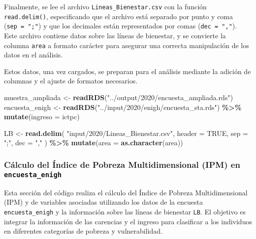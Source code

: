\documentclass[
  12pt,
]{book}
\newenvironment{Shaded}{\begin{snugshade}}{\end{snugshade}}
\newcommand{\AttributeTok}[1]{\textcolor[rgb]{0.13,0.29,0.53}{#1}}
\newcommand{\ConstantTok}[1]{\textcolor[rgb]{0.56,0.35,0.01}{#1}}
\newcommand{\FunctionTok}[1]{\textcolor[rgb]{0.13,0.29,0.53}{\textbf{#1}}}
\newcommand{\NormalTok}[1]{#1}
\newcommand{\OtherTok}[1]{\textcolor[rgb]{0.56,0.35,0.01}{#1}}
\newcommand{\SpecialCharTok}[1]{\textcolor[rgb]{0.81,0.36,0.00}{\textbf{#1}}}
\newcommand{\StringTok}[1]{\textcolor[rgb]{0.31,0.60,0.02}{#1}}
\begin{document}
Finalmente, se lee el archivo \texttt{Lineas\_Bienestar.csv} con la función \texttt{read.delim()}, especificando que el archivo está separado por punto y coma (\texttt{sep\ =\ ";"}) y que los decimales están representados por comas (\texttt{dec\ =\ ","}). Este archivo contiene datos sobre las líneas de bienestar, y se convierte la columna \texttt{area} a formato carácter para asegurar una correcta manipulación de los datos en el análisis.

Estos datos, una vez cargados, se preparan para el análisis mediante la adición de columnas y el ajuste de formatos necesarios.

\begin{Shaded}
\begin{Highlighting}[]
\NormalTok{muestra\_ampliada }\OtherTok{\textless{}{-}} \FunctionTok{readRDS}\NormalTok{(}\StringTok{"../output/2020/encuesta\_ampliada.rds"}\NormalTok{)}
\NormalTok{encuesta\_enigh }\OtherTok{\textless{}{-}} \FunctionTok{readRDS}\NormalTok{(}\StringTok{"../input/2020/enigh/encuesta\_sta.rds"}\NormalTok{) }\SpecialCharTok{\%\textgreater{}\%}
  \FunctionTok{mutate}\NormalTok{(}\AttributeTok{ingreso =}\NormalTok{ ictpc)}

\NormalTok{LB }\OtherTok{\textless{}{-}} \FunctionTok{read.delim}\NormalTok{(}
    \StringTok{"input/2020/Lineas\_Bienestar.csv"}\NormalTok{,}
    \AttributeTok{header =} \ConstantTok{TRUE}\NormalTok{,}
    \AttributeTok{sep =} \StringTok{";"}\NormalTok{,}
    \AttributeTok{dec =} \StringTok{","}
\NormalTok{  ) }\SpecialCharTok{\%\textgreater{}\%} \FunctionTok{mutate}\NormalTok{(}\AttributeTok{area =} \FunctionTok{as.character}\NormalTok{(area))}
\end{Highlighting}
\end{Shaded}

\hypertarget{cuxe1lculo-del-uxedndice-de-pobreza-multidimensional-ipm-en-encuesta_enigh}{%
\subsubsection*{\texorpdfstring{Cálculo del Índice de Pobreza Multidimensional (IPM) en \texttt{encuesta\_enigh}}{Cálculo del Índice de Pobreza Multidimensional (IPM) en encuesta\_enigh}}\label{cuxe1lculo-del-uxedndice-de-pobreza-multidimensional-ipm-en-encuesta_enigh}}

Esta sección del código realiza el cálculo del Índice de Pobreza Multidimensional (IPM) y de variables asociadas utilizando los datos de la encuesta \texttt{encuesta\_enigh} y la información sobre las líneas de bienestar \texttt{LB}. El objetivo es integrar la información de las carencias y el ingreso para clasificar a los individuos en diferentes categorías de pobreza y vulnerabilidad.
\end{document}
